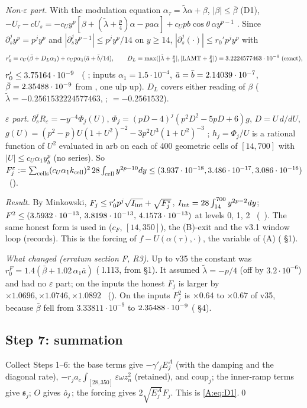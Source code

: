 \documentclass[11pt]{article}
\begin{document}
\emph{Non-$\varepsilon$ part.} With the modulation equation $\alpha_\tau=\tilde\lambda\alpha+\beta$, $|\beta|\le\bar\beta$ (D1), $-U_\tau-cU_s=-c_Uy^p[\beta+(\tilde\lambda+\frac p4)\alpha-pa\alpha]+c_Upb\cos\theta\,\alpha y^{p-1}$ \tS. Since $\partial_s^jy^p=p^jy^p$ and $|\partial_s^jy^{p-1}|\le p^jy^p/14$ on $y\ge14$, $|\partial_s^j(\cdot)|\le r_0'p^jy^p$ with
\[r_0'=c_U(\bar\beta+D_L\alpha_1)+c_Up\alpha_1(\bar a+\bar b/14),\qquad D_L=\max(|\tilde\lambda+\tfrac p4|,|\mathrm{LAMT}+\tfrac p4|)=3.2224577463\cdot10^{-6}\ \text{(exact)},\]
$r_0'\le3.75164\cdot10^{-9}$ \tC\ ( ; inputs $\alpha_1=1.5\cdot10^{-4}$, $\bar a=\bar b=2.14039\cdot10^{-7}$, $\bar\beta=2.35488\cdot10^{-9}$ from  , one ulp up). $D_L$ covers either reading of $\beta$ ($\tilde\lambda=-0.2561532224577463$, ; $=-0.2561532$).

\emph{$\varepsilon$ part.} $\partial_s^jR_\varepsilon=-y^{-4}\Phi_j(U)$, $\Phi_j=(pD-4)^j(p^2D^2-5pD+6)g$, $D=U\,d/dU$, $g(U)=(p^2-p)U(1+U^2)^{-2}-3p^2U^3(1+U^2)^{-3}$ \tS; $h_j=\Phi_j/U$ is a rational function of $U^2$ evaluated in arb on each of 400 geometric cells of $[14,700]$ with $|U|\le c_U\alpha_1y_b^p$ (no series). So $F^\varepsilon_j:=\sum_{\rm cells}(c_U\alpha_1k_{\rm cell})^2\,28\int_{\rm cell}y^{2p-10}dy\le(3.937\cdot10^{-18},3.486\cdot10^{-17},3.086\cdot10^{-16})$ \tC\ ().

\emph{Result.} By Minkowski, $F_j\le r_0'p^j\sqrt{I_{\rm int}}+\sqrt{F^\varepsilon_j}$, $I_{\rm int}=28\int_{14}^{700}y^{2p-2}dy$; $F^2\le(3.5932\cdot10^{-13},\,3.8198\cdot10^{-13},\,4.1573\cdot10^{-13})$ at levels 0, 1, 2 \tC\ (\SA\ ). The same honest form is used in  ($c_F$, $[14,350]$), the (B)-exit and the v3.1 window loop (records). This is the forcing of $f-U(\alpha(\tau),\cdot)$, the variable of (A) ( \S1).

\emph{What changed (erratum section F, R3).} Up to v35 the constant was $r^F_0=1.4(\bar\beta+1.02\,\alpha_1\bar a)$ ( l.113, from  \S1). It assumed $\tilde\lambda=-p/4$ (off by $3.2\cdot10^{-6}$) and had no $\varepsilon$ part; on the  inputs the honest $F_j$ is larger by $\times1.0696,\times1.0746,\times1.0892$ \tC\ (). On the  inputs $F_j^2$ is $\times0.64$ to $\times0.67$ of v35, because $\bar\beta$ fell from $3.33811\cdot10^{-9}$ to $2.35488\cdot10^{-9}$ ( \S4).

\subsection{Step 7: summation}
Collect Steps 1--6: the base terms give $-\gamma'_jE^A_j$ (with the damping and the diagonal rate), $-r_ja_c\int_{[28,350]}\varepsilon\omega z_n^2$ (retained), and $\mathrm{coup}_j$; the inner-ramp terms give $\mathfrak s_j$; $O$ gives $\hat o_j$; the forcing gives $2\sqrt{E^A_j}F_j$. This is \eqref{A:eq:D1}.\qed
\end{document}
